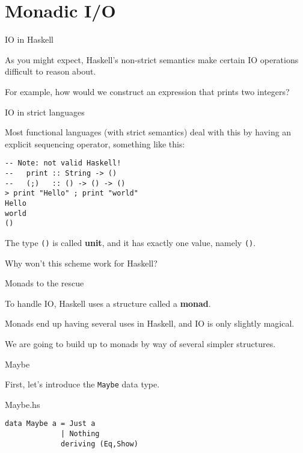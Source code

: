 
\section{Monadic I/O}

%
\begin{frame}[fragile]{IO in Haskell}

As you might expect, Haskell's non-strict semantics make certain IO operations
difficult to reason about.

For example, how would we construct an expression that prints two integers?

\end{frame}

%
\begin{frame}[fragile]{IO in strict languages}

Most functional languages (with strict semantics) deal with this by having an
explicit sequencing operator, something like this:

\begin{block}{}
\begin{verbatim}
-- Note: not valid Haskell!
--   print :: String -> ()
--   (;)   :: () -> () -> ()
> print "Hello" ; print "world"
Hello
world
()
\end{verbatim}
\end{block}

The type \texttt{()} is called \textbf{unit}, and it has exactly one value,
namely \texttt{()}.

Why won't this scheme work for Haskell?

\end{frame}

%
\begin{frame}[fragile]{Monads to the rescue}

To handle IO, Haskell uses a structure called a \textbf{monad}.

Monads end up having several uses in Haskell, and IO is only slightly magical.

We are going to build up to monads by way of several simpler structures.

\end{frame}

%
\begin{frame}[fragile]{Maybe}

First, let's introduce the \texttt{Maybe} data type.

\begin{block}{Maybe.hs}
\begin{verbatim}
data Maybe a = Just a
             | Nothing
             deriving (Eq,Show)
\end{verbatim}
\end{block}

\end{frame}

